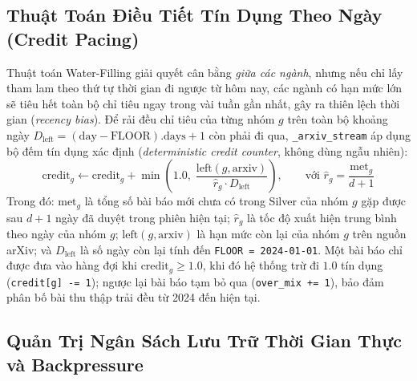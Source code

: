 \subsection{Thuật Toán Điều Tiết Tín Dụng Theo Ngày (Credit Pacing)}
\label{sec:ch2_credit_pacing}

Thuật toán Water-Filling giải quyết cân bằng \textit{giữa các ngành}, nhưng nếu chỉ lấy tham lam theo thứ tự thời gian đi ngược từ hôm nay, các ngành có hạn mức lớn sẽ tiêu hết toàn bộ chỉ tiêu ngay trong vài tuần gần nhất, gây ra thiên lệch thời gian (\textit{recency bias}). Để rải đều chỉ tiêu của từng nhóm $g$ trên toàn bộ khoảng ngày $D_{\text{left}} = (\text{day} - \text{FLOOR}).\text{days} + 1$ còn phải đi qua, \texttt{\_arxiv\_stream} áp dụng bộ đếm tín dụng xác định (\textit{deterministic credit counter}, không dùng ngẫu nhiên):
\begin{equation}
  \text{credit}_g \leftarrow \text{credit}_g + \min\!\left(1.0,\; \frac{\text{left}(g, \text{arxiv})}{\hat{r}_g \cdot D_{\text{left}}}\right), \qquad \text{với } \hat{r}_g = \frac{\text{met}_g}{d + 1}
  \label{eq:ch2_credit_pacing}
\end{equation}
\noindent Trong đó: $\text{met}_g$ là tổng số bài báo mới chưa có trong Silver của nhóm $g$ gặp được sau $d+1$ ngày đã duyệt trong phiên hiện tại; $\hat{r}_g$ là tốc độ xuất hiện trung bình theo ngày của nhóm $g$; $\text{left}(g, \text{arxiv})$ là hạn mức còn lại của nhóm $g$ trên nguồn arXiv; và $D_{\text{left}}$ là số ngày còn lại tính đến \texttt{FLOOR = 2024-01-01}. Một bài báo chỉ được đưa vào hàng đợi khi $\text{credit}_g \ge 1.0$, khi đó hệ thống trừ đi $1.0$ tín dụng (\texttt{credit[g] -= 1}); ngược lại bài báo tạm bỏ qua (\texttt{over\_mix += 1}), bảo đảm phân bố bài thu thập trải đều từ 2024 đến hiện tại.

\subsection{Quản Trị Ngân Sách Lưu Trữ Thời Gian Thực và Backpressure}
\label{sec:ch2_budget}

